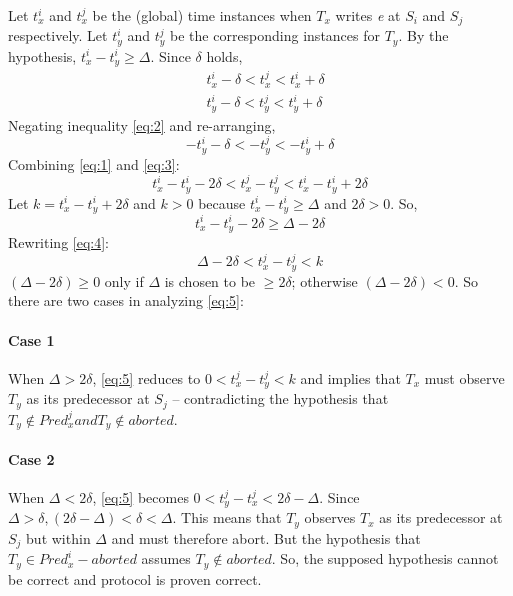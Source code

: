 Let $t_{x}^{i}$ and $t_{x}^{j}$ be the (global) time instances when $T_x$ writes \emph{e} at $S_i$ and $S_j$ respectively.
Let $t_{y}^{i}$ and $t_{y}^{j}$ be the corresponding instances for $T_y$.
By the hypothesis, $t_{x}^{i} - t_{y}^{i} \geq \Delta$.
Since $\delta$ holds,
\begin{align}
  & t_{x}^{i} - \delta <  t_{x}^{j} <  t_{x}^{i} + \delta  \label{eq:1} \\
  & t_{y}^{i} - \delta <  t_{y}^{j} <  t_{y}^{i} + \delta \label{eq:2}
\end{align}
Negating inequality \ref{eq:2} and re-arranging,
\begin{equation}
  - t_{y}^{i} - \delta < - t_{y}^{j} < - t_{y}^{i} + \delta \label{eq:3}
\end{equation}
Combining \ref{eq:1} and \ref{eq:3}:
\begin{equation}
  t_{x}^{i} - t_{y}^{i} - 2 \delta < t_{x}^{j} - t_{y}^{j} < t_{x}^{i} - t_{y}^{i} + 2 \delta\label{eq:4}
\end{equation}
Let $k = t_{x}^{i} - t_{y}^{i} + 2 \delta$ and $k>0$ because $t_{x}^{i} - t_{y}^{i} \geq \Delta$ and $2\delta>0$. So,
\begin{equation}
  t_{x}^{i} - t_{y}^{i} - 2 \delta \geq \Delta - 2 \delta
\end{equation}
Rewriting \ref{eq:4}:
\begin{equation}
  \Delta  -2 \delta < t_{x}^{j} - t_{y}^{j} < k \label{eq:5}
\end{equation}
$(\Delta - 2 \delta) \geq 0 $ only if $\Delta$ is chosen to be $\geq 2\delta$; otherwise $(\Delta - 2 \delta) < 0 $.
So there are two cases in analyzing \ref{eq:5}:
\paragraph{Case 1}
When $\Delta > 2 \delta$, \ref{eq:5} reduces to $0 < t_{x}^{j} - t_{y}^{j} < k $ and implies that $T_x$ must observe $T_y$ as its predecessor at $S_j$ -- contradicting the hypothesis that $T_y \not\in Pred_{x}^{j} and T_y \not\in aborted$.
\paragraph{Case 2}
When  $\Delta < 2 \delta$, \ref{eq:5} becomes $0 < t_{y}^{j} - t_{x}^{j} < 2 \delta - \Delta$.
Since $\Delta > \delta, (2\delta - \Delta) < \delta < \Delta$.
This means that $T_y$ observes $T_x$ as its predecessor at $S_j$ but within $\Delta$ and must therefore abort. But the hypothesis that $T_y \in Pred_{x}^{i}-aborted$ assumes $T_y \not\in aborted$. So, the supposed hypothesis cannot be correct and \tDelta protocol is proven correct.
